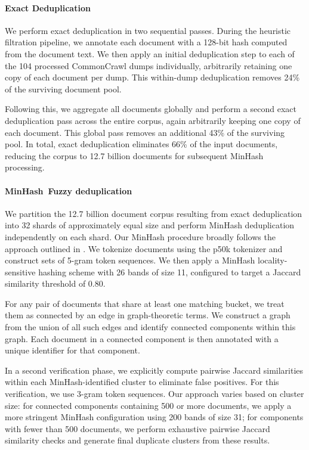 \documentclass[table]{ai2style/ai2}
\begin{document}
{{\paragraph{Exact Deduplication}

We perform exact deduplication in two sequential passes. During the heuristic filtration pipeline, we annotate each document with a 128-bit hash computed from the document text. We then apply an initial deduplication step to each of the 104 processed CommonCrawl dumps individually, arbitrarily retaining one copy of each document per dump. This within-dump deduplication removes 24\% of the surviving document pool.

Following this, we aggregate all documents globally and perform a second exact deduplication pass across the entire corpus, again arbitrarily keeping one copy of each document. This global pass removes an additional 43\% of the surviving pool. In total, exact deduplication eliminates 66\% of the input documents, reducing the corpus to 12.7 billion documents for subsequent MinHash processing.

\paragraph{MinHash~Fuzzy deduplication}

We partition the 12.7 billion document corpus resulting from exact deduplication into 32 shards of approximately equal size and perform MinHash deduplication independently on each shard. Our MinHash procedure broadly follows the approach outlined in \citep{lee2022deduplicatingtrainingdatamakes}. We tokenize documents using the p50k tokenizer and construct sets of 5-gram token sequences. We then apply a MinHash locality-sensitive hashing scheme with 26 bands of size 11, configured to target a Jaccard similarity threshold of 0.80.

For any pair of documents that share at least one matching bucket, we treat them as connected by an edge in graph-theoretic terms. We construct a graph from the union of all such edges and identify connected components within this graph. Each document in a connected component is then annotated with a unique identifier for that component.

In a second verification phase, we explicitly compute pairwise Jaccard similarities within each MinHash-identified cluster to eliminate false positives. For this verification, we use 3-gram token sequences. Our approach varies based on cluster size: for connected components containing 500 or more documents, we apply a more stringent MinHash configuration using 200 bands of size 31; for components with fewer than 500 documents, we perform exhaustive pairwise Jaccard similarity checks and generate final duplicate clusters from these results.

}}
\end{document}
